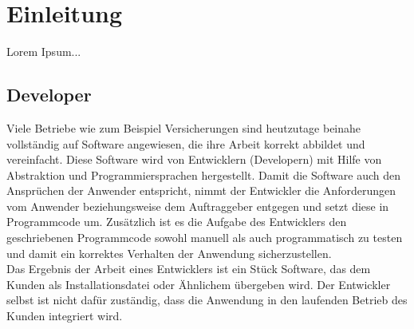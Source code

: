\chapter{Einleitung}
Lorem Ipsum...

\section{Developer}
Viele Betriebe wie zum Beispiel Versicherungen sind heutzutage beinahe vollständig auf Software angewiesen, die ihre Arbeit korrekt abbildet und vereinfacht. Diese Software wird von Entwicklern (Developern) mit Hilfe von Abstraktion und Programmiersprachen hergestellt. Damit die Software auch den Ansprüchen der Anwender entspricht, nimmt der Entwickler die Anforderungen vom Anwender beziehungsweise dem Auftraggeber entgegen und setzt diese in Programmcode um. Zusätzlich ist es die Aufgabe des Entwicklers den geschriebenen Programmcode sowohl manuell als auch programmatisch zu testen und damit ein korrektes Verhalten der Anwendung sicherzustellen.\\
Das Ergebnis der Arbeit eines Entwicklers ist ein Stück Software, das dem Kunden als Installationsdatei oder Ähnlichem übergeben wird. Der Entwickler selbst ist nicht dafür zuständig, dass die Anwendung in den laufenden Betrieb des Kunden integriert wird.

